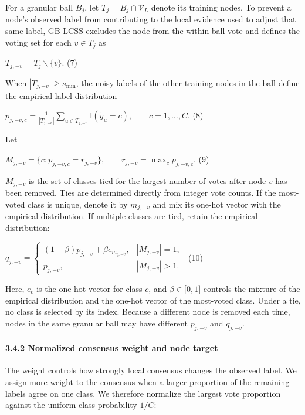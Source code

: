For a granular ball \(B_{j}\), let \(T_{j} = B_{j} \cap \mathcal{V}_{L}\) denote its training nodes. To prevent a node's observed label from contributing to the local evidence used to adjust that same label, GB-LCSS excludes the node from the within-ball vote and defines the voting set for each \(v \in T_{j}\) as

\(T_{j, - v} = T_{j}\backslash\{ v\}.\) (7)

When \(|T_{j, - v}| \geq s_{\min}\), the noisy labels of the other training nodes in the ball define the empirical label distribution

\(p_{j, - v,c} = \frac{1}{|T_{j, - v}|}\sum_{u \in T_{j, - v}}^{}\mathbb{I}({\widetilde{y}}_{u} = c),\quad\quad c = 1,\ldots,C.\) (8)

Let

\(M_{j, - v} = \{ c:p_{j, - v,c} = r_{j, - v}\},\quad\quad r_{j, - v} = \max_{c}p_{j, - v,c}.\) (9)

\(M_{j, - v}\) is the set of classes tied for the largest number of votes after node \(v\) has been removed. Ties are determined directly from integer vote counts. If the most-voted class is unique, denote it by \(m_{j, - v}\) and mix its one-hot vector with the empirical distribution. If multiple classes are tied, retain the empirical distribution:

\(q_{j, - v} = \left\{ \begin{matrix}
(1 - \beta)p_{j, - v} + \beta e_{m_{j, - v}}, & |M_{j, - v}| = 1, \\
p_{j, - v}, & |M_{j, - v}| > 1.
\end{matrix} \right.\ \) (10)

Here, \(e_{c}\) is the one-hot vector for class \(c\), and \(\beta \in \lbrack 0,1\rbrack\) controls the mixture of the empirical distribution and the one-hot vector of the most-voted class. Under a tie, no class is selected by its index. Because a different node is removed each time, nodes in the same granular ball may have different \(p_{j, - v}\) and \(q_{j, - v}\).

\paragraph{3.4.2 Normalized consensus weight and node target}\label{normalized-consensus-weight-and-node-target}

The weight controls how strongly local consensus changes the observed label. We assign more weight to the consensus when a larger proportion of the remaining labels agree on one class. We therefore normalize the largest vote proportion against the uniform class probability \(1/C\):

